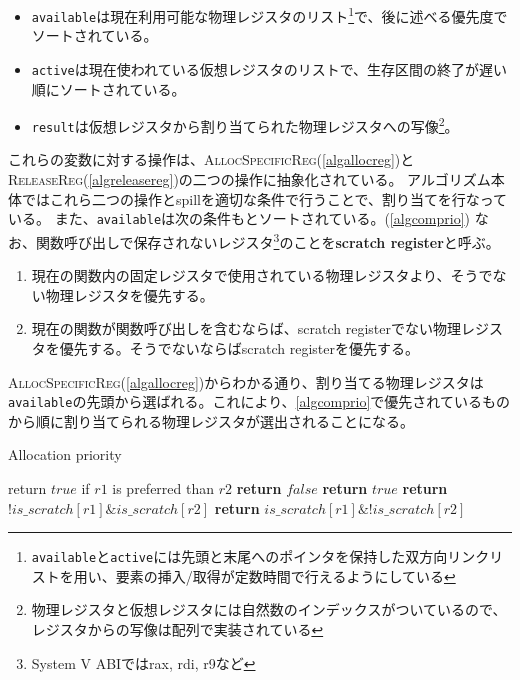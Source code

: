 \documentclass[../main.tex]{subfiles}
\begin{document}
\begin{itemize}
  \item \texttt{available}は現在利用可能な物理レジスタのリスト\footnote{\texttt{available}と\texttt{active}には先頭と末尾へのポインタを保持した双方向リンクリストを用い、要素の挿入/取得が定数時間で行えるようにしている}で、後に述べる優先度でソートされている。
  \item \texttt{active}は現在使われている仮想レジスタのリストで、生存区間の終了が遅い順にソートされている。
  \item \texttt{result}は仮想レジスタから割り当てられた物理レジスタへの写像\footnote{物理レジスタと仮想レジスタには自然数のインデックスがついているので、レジスタからの写像は配列で実装されている}。
\end{itemize}

これらの変数に対する操作は、\textsc{AllocSpecificReg}(\cref{algallocreg})と\textsc{ReleaseReg}(\cref{algreleasereg})の二つの操作に抽象化されている。
アルゴリズム本体ではこれら二つの操作とspillを適切な条件で行うことで、割り当てを行なっている。
また、\texttt{available}は次の条件もとソートされている。(\cref{algcomprio})
なお、関数呼び出しで保存されないレジスタ\footnote{System V ABIではrax, rdi, r9など}のことを\textbf{scratch register}と呼ぶ。

\begin{enumerate}
  \item 現在の関数内の固定レジスタで使用されている物理レジスタより、そうでない物理レジスタを優先する。
  \item 現在の関数が関数呼び出しを含むならば、scratch registerでない物理レジスタを優先する。そうでないならばscratch registerを優先する。
\end{enumerate}

\textsc{AllocSpecificReg}(\cref{algallocreg})からわかる通り、割り当てる物理レジスタは\texttt{available}の先頭から選ばれる。これにより、\cref{algcomprio}で優先されているものから順に割り当てられる物理レジスタが選出されることになる。

\begin{algorithm}
\caption{Allocation priority}\label{algcomprio}
\begin{algorithmic}[1]
  \Ensure return $true$ if $r1$ is preferred than $r2$
    \State \textbf{return} $false$
  \EndIf
    \State \textbf{return} $true$
  \EndIf
    \State \textbf{return} $\mathord{!}is\_scratch[r1] \mathbin{\&} is\_scratch[r2]$
  \Else
    \State \textbf{return} $is\_scratch[r1] \mathbin{\&} \mathord{!}is\_scratch[r2]$
  \EndIf
\EndFunction
\end{algorithmic}
\end{algorithm}
\end{document}
